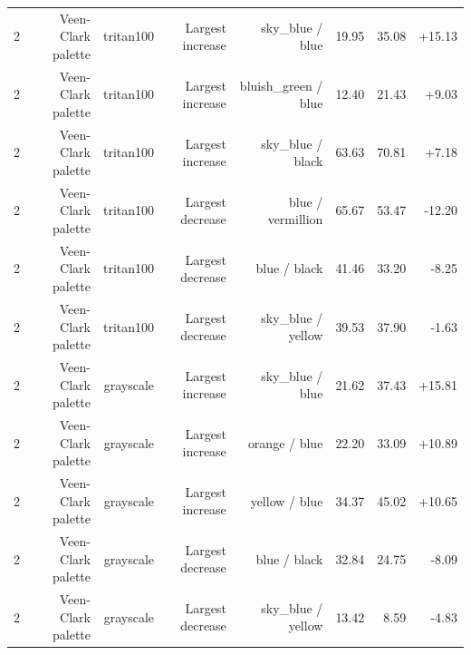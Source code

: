\begin{tabular}{lrrrrrrr}
2 & Veen-Clark palette & tritan100 & Largest increase & sky\_blue / blue & 19.95 & 35.08 & +15.13 \\
2 & Veen-Clark palette & tritan100 & Largest increase & bluish\_green / blue & 12.40 & 21.43 & +9.03 \\
2 & Veen-Clark palette & tritan100 & Largest increase & sky\_blue / black & 63.63 & 70.81 & +7.18 \\
2 & Veen-Clark palette & tritan100 & Largest decrease & blue / vermillion & 65.67 & 53.47 & -12.20 \\
2 & Veen-Clark palette & tritan100 & Largest decrease & blue / black & 41.46 & 33.20 & -8.25 \\
2 & Veen-Clark palette & tritan100 & Largest decrease & sky\_blue / yellow & 39.53 & 37.90 & -1.63 \\
2 & Veen-Clark palette & grayscale & Largest increase & sky\_blue / blue & 21.62 & 37.43 & +15.81 \\
2 & Veen-Clark palette & grayscale & Largest increase & orange / blue & 22.20 & 33.09 & +10.89 \\
2 & Veen-Clark palette & grayscale & Largest increase & yellow / blue & 34.37 & 45.02 & +10.65 \\
2 & Veen-Clark palette & grayscale & Largest decrease & blue / black & 32.84 & 24.75 & -8.09 \\
2 & Veen-Clark palette & grayscale & Largest decrease & sky\_blue / yellow & 13.42 & 8.59 & -4.83 \\
\bottomrule
\end{tabular}
